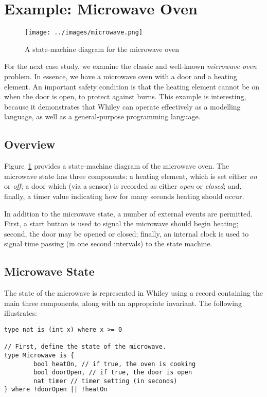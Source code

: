 \newpage
\section{Example: Microwave Oven}
\label{microwave}
\begin{figure}[!t]
\centering
\texttt{[image: ../images/microwave.png]}
\caption{A state-machine diagram for the microwave oven}
\label{fig_microwave}
\end{figure}

For the next case study, we examine the classic and well-known {\em microwave oven} problem.  In essence, we have a microwave oven with a door and a heating element.  An important safety condition is that the heating element cannot be on when the door is open, to protect against burns.  This example is interesting, because it demonstrates that Whiley can operate effectively as a modelling language, as well as a general-purpose programming language.

\subsection{Overview}
Figure~\ref{fig_microwave} provides a state-machine diagram of the
microwave oven.  The microwave state has three components: a heating
element, which is set either {\em on} or {\em off}; a door which (via
a sensor) is recorded as either {\em open} or {\em closed}; and, finally, a timer value indicating how for many seconds heating should occur.

In addition to the microwave state, a number of external events are permitted.  First, a start button is used to signal the microwave should begin heating; second, the door may be opened or closed; finally, an internal clock is used to signal time passing (in one second intervals) to the state machine.

\subsection{Microwave State}
The state of the microwave is represented in Whiley using a record containing the main three components, along with an appropriate invariant.  The following illustrates:

\begin{lstlisting}
type nat is (int x) where x >= 0

// First, define the state of the microwave.
type Microwave is {
        bool heatOn, // if true, the oven is cooking
        bool doorOpen, // if true, the door is open
        nat timer // timer setting (in seconds)
} where !doorOpen || !heatOn
\end{lstlisting}

